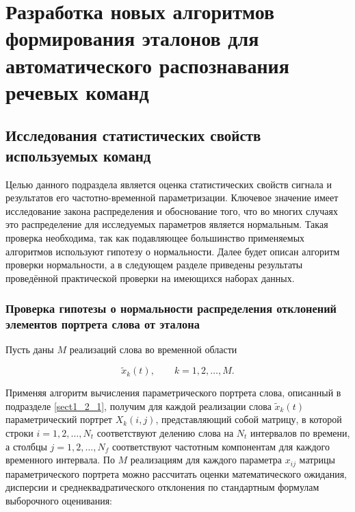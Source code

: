 \chapter{Разработка новых алгоритмов формирования эталонов для автоматического распознавания речевых команд} \label{chapt2}

\section{Исследования статистических свойств используемых команд} \label{sect2_1}

Целью данного подраздела является оценка статистических свойств сигнала и результатов его частотно-временной параметризации.
Ключевое значение имеет исследование закона распределения и обоснование того, что во многих случаях это распределение для исследуемых параметров является нормальным.
Такая проверка необходима, так как подавляющее большинство применяемых алгоритмов используют гипотезу о нормальности.
Далее будет описан алгоритм проверки нормальности, а в следующем разделе приведены результаты проведённой практической проверки на имеющихся наборах данных.


\subsection{Проверка гипотезы о нормальности распределения отклонений элементов портрета слова от эталона} \label{sect2_1_1}

Пусть даны $M$ реализаций слова во временной области

\begin{equation} \label{eq:2_1_1_1}
\tilde{x}_k (t), \qquad k = 1, 2, \dots, M.
\end{equation}

Применяя алгоритм вычисления параметрического портрета слова, описанный в подразделе \ref{sect1_2_1}, получим для каждой реализации слова $\tilde{x}_k (t)$ параметрический портрет $X_k (i, j)$, представляющий собой матрицу, в которой строки $i = 1, 2, \dots, N_t$ соответствуют делению слова на $N_t$ интервалов по времени, а столбцы $j = 1, 2, \dots, N_f$ соответствуют частотным компонентам для каждого временного интервала.
По $M$ реализациям для каждого параметра $x_{ij}$ матрицы параметрического портрета можно рассчитать оценки математического ожидания, дисперсии и среднеквадратического отклонения по стандартным формулам выборочного оценивания:

